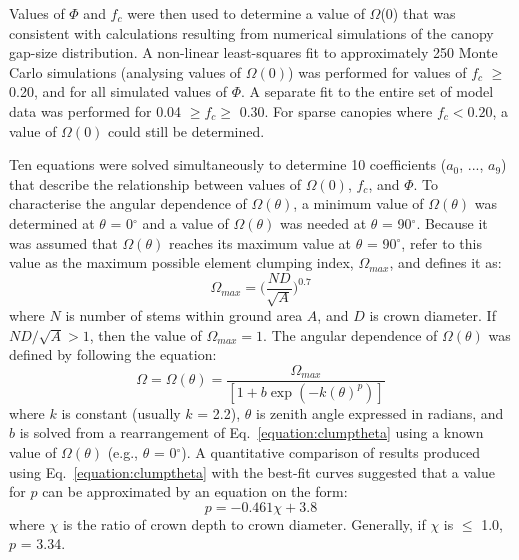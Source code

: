 \documentclass[a4paper,11pt]{report}
\begin{document}
Values of $\Phi$ and $f_c$ were then used to determine a value of $\Omega$(0) that was consistent with calculations resulting from numerical simulations of the canopy gap-size distribution. A non-linear least-squares fit to approximately 250 Monte Carlo simulations (analysing values of $\Omega(0)$) was performed for values of $f_c$ $\geq$ 0.20, and for all simulated values of $\Phi$. A separate fit to the entire set of model data was performed for 0.04 $\geq f_c \geq$ 0.30. For sparse canopies where $f_c < 0.20$, a value of $\Omega(0)$ could still be determined. 

Ten equations were solved simultaneously to determine 10 coefficients ($a_0$, ..., $a_9$) that describe the relationship between values of $\Omega(0)$, $f_c$, and $\Phi$. To characterise the angular dependence of $\Omega(\theta)$, a minimum value of $\Omega(\theta)$ was determined at $\theta$ = 0$^{\circ}$ and a value of $\Omega(\theta)$ was needed at $\theta$ = 90$^{\circ}$. Because it was assumed that $\Omega(\theta)$ reaches its maximum value at $\theta$ = 90$^{\circ}$, \citet{Kucharik1999} refer to this value as the maximum possible element clumping index, $\Omega_{max}$, and defines it as:
\begin{equation}
\Omega_{max} = \Big(\frac{ND}{\sqrt{A}}\Big)^{0.7}
\label{equation:clumpmax}
\end{equation}
\noindent where $N$ is number of stems within ground area $A$, and $D$ is crown diameter. If $ND/\sqrt{A} > 1$, then the value of $\Omega_{max} = 1$. The angular dependence of $\Omega(\theta)$ was defined by \citet{Kucharik1999} following the equation: 
\begin{equation}
\Omega = \Omega(\theta) = \frac{\Omega_{max}}{[1 + b\exp(-k(\theta)^p)]}
\label{equation:clumptheta}
\end{equation}
\noindent where $k$ is constant (usually $k$ = 2.2), $\theta$ is zenith angle expressed in radians, and $b$ is solved from a rearrangement of Eq.~\ref{equation:clumptheta} using a known value of $\Omega(\theta)$ (e.g., $\theta$ = 0$^{\circ}$). A quantitative comparison of results produced using Eq.~\ref{equation:clumptheta} with the best-fit curves suggested that a value for $p$ can be approximated by an equation on the form:
\begin{equation}
p = -0.461\chi + 3.8
\label{equation:pchi}
\end{equation}
\noindent where $\chi$ is the ratio of crown depth to crown diameter. Generally, if $\chi$ is $\leq$ 1.0, $p$ = 3.34. 
\end{document}
